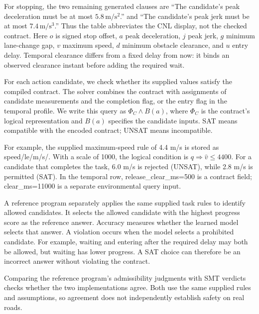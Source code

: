\documentclass[nolineno]{ieeeaccess}
\begin{document}
For stopping, the two remaining generated clauses are “The candidate's peak deceleration must be at most $5.8\,\mathrm{m/s^{2}}$.” and “The candidate's peak jerk must be at most $7.4\,\mathrm{m/s^{3}}$.” Thus the table abbreviates the CNL display, not the checked contract. Here $o$ is signed stop offset, $a$ peak deceleration, $j$ peak jerk, $g$ minimum lane-change gap, $v$ maximum speed, $d$ minimum obstacle clearance, and $u$ entry delay. Temporal clearance differs from a fixed delay from now: it binds an observed clearance instant before adding the required wait.\par

For each action candidate, we check whether its supplied values satisfy the compiled contract. The solver combines the contract with assignments of candidate measurements and the completion flag, or the entry flag in the temporal profile. We write this query as $\Phi_C\land B(a)$, where $\Phi_C$ is the contract's logical representation and $B(a)$ specifies the candidate inputs. SAT means compatible with the encoded contract; UNSAT means incompatible.\par

For example, the supplied maximum-speed rule of 4.4 m/s is stored as {\ttfamily{}\selectfont\footnotesize speed/\allowbreak le/\allowbreak m/\allowbreak s/}. With a scale of 1000, the logical condition is $q\Rightarrow\widehat{v}\leq4400$. For a candidate that completes the task, 6.0 m/s is rejected (UNSAT), while 2.8 m/s is permitted (SAT). In the temporal row, {\ttfamily{}\selectfont\footnotesize release\_\allowbreak clear\_\allowbreak ms=500} is a contract field; {\ttfamily{}\selectfont\footnotesize clear\_\allowbreak ms=11000} is a separate environmental query input.\par

A reference program separately applies the same supplied task rules to identify allowed candidates. It selects the allowed candidate with the highest progress score as the reference answer. Accuracy measures whether the learned model selects that answer. A violation occurs when the model selects a prohibited candidate. For example, waiting and entering after the required delay may both be allowed, but waiting has lower progress. A SAT choice can therefore be an incorrect answer without violating the contract.\par

Comparing the reference program's admissibility judgments with SMT verdicts checks whether the two implementations agree. Both use the same supplied rules and assumptions, so agreement does not independently establish safety on real roads.\par
\end{document}

